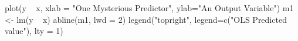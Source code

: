 \begin{Schunk}
\begin{Sinput}
 plot(y ~ x, xlab = "One Mysterious Predictor", ylab="An Output Variable")
 m1 <- lm(y ~ x)
 abline(m1, lwd = 2)
 legend("topright", legend=c("OLS Predicted value"), lty = 1)
\end{Sinput}
\end{Schunk}
